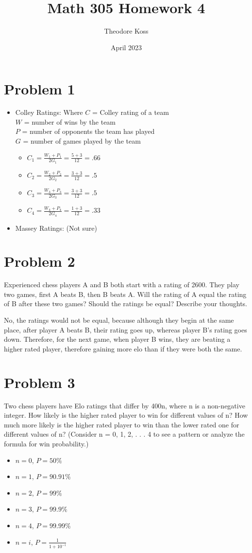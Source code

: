 \documentclass{article}
\title{Math 305 Homework 4}
\author{Theodore Koss}
\date{April 2023}
\begin{document}
\maketitle
\section*{Problem 1}\begin{itemize}
    \item Colley Ratings: Where $C$ = Colley rating of a team\\
$W$ = number of wins by the team\\
$P$ = number of opponents the team has played\\
$G$ = number of games played by the team\\ \begin{itemize}
        \item $C_1=\frac{W_1+P_1}{2G_1}=\frac{5+3}{12}=.66$
        \item $C_2=\frac{W_2+P_2}{2G_2}=\frac{3+3}{12}=.5$
        \item $C_3=\frac{W_3+P_3}{2G_3}=\frac{3+3}{12}=.5$
        \item $C_4=\frac{W_4+P_4}{2G_4}=\frac{1+3}{12}=.33$
    \end{itemize}
    \item Massey Ratings: (Not sure)
\end{itemize}
\section*{Problem 2}
Experienced chess players A and B both start with a rating of 2600. They play two
games, first A beats B, then B beats A. Will the rating of A equal the rating of B after
these two games? Should the ratings be equal? Describe your thoughts.\par\null\par No, the ratings would not be equal, because although they begin at the same place, after player A beats B, their rating goes up, whereas player B's rating goes down. Therefore, for the next game, when player B wins, they are beating a higher rated player, therefore gaining more elo than if they were both the same.
\section*{Problem 3}
Two chess players have Elo ratings that differ by 400n, where n is a non-negative
integer. How likely is the higher rated player to win for different values of n? How
much more likely is the higher rated player to win than the lower rated one for
different values of n? (Consider n = 0, 1, 2, . . . 4 to see a pattern or analyze the
formula for win probability.)\begin{itemize}
    \item $n=0$, $P=50\%$
    \item $n=1$, $P=90.91\%$
    \item $n=2$, $P=99\%$
    \item $n=3$, $P=99.9\%$
    \item $n=4$, $P=99.99\%$
    \item $n=i$, $P=\frac{1}{1+10^{-i}}$
\end{itemize}
\end{document}
